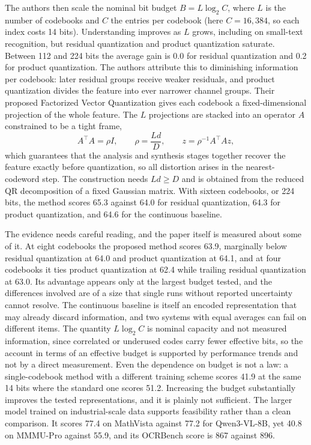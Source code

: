 \documentclass[11pt]{article}
\theoremstyle{remark}
\begin{document}
The authors then scale the nominal bit budget $B = L\log_2 C$, where $L$ is the number of codebooks and $C$ the entries per codebook (here $C = 16{,}384$, so each index costs 14 bits). Understanding improves as $L$ grows, including on small-text recognition, but residual quantization and product quantization saturate. Between 112 and 224 bits the average gain is 0.0 for residual quantization and 0.2 for product quantization. The authors attribute this to diminishing information per codebook: later residual groups receive weaker residuals, and product quantization divides the feature into ever narrower channel groups. Their proposed Factorized Vector Quantization gives each codebook a fixed-dimensional projection of the whole feature. The $L$ projections are stacked into an operator $A$ constrained to be a tight frame,
\begin{equation}
A^{\top}A = \rho I, \qquad \rho = \frac{Ld}{D}, \qquad z = \rho^{-1}A^{\top}Az,
\end{equation}
which guarantees that the analysis and synthesis stages together recover the feature exactly before quantization, so all distortion arises in the nearest-codeword step. The construction needs $Ld \ge D$ and is obtained from the reduced QR decomposition of a fixed Gaussian matrix. With sixteen codebooks, or 224 bits, the method scores 65.3 against 64.0 for residual quantization, 64.3 for product quantization, and 64.6 for the continuous baseline.

The evidence needs careful reading, and the paper itself is measured about some of it. At eight codebooks the proposed method scores 63.9, marginally below residual quantization at 64.0 and product quantization at 64.1, and at four codebooks it ties product quantization at 62.4 while trailing residual quantization at 63.0. Its advantage appears only at the largest budget tested, and the differences involved are of a size that single runs without reported uncertainty cannot resolve. The continuous baseline is itself an encoded representation that may already discard information, and two systems with equal averages can fail on different items. The quantity $L\log_2 C$ is nominal capacity and not measured information, since correlated or underused codes carry fewer effective bits, so the account in terms of an effective budget is supported by performance trends and not by a direct measurement. Even the dependence on budget is not a law: a single-codebook method with a different training scheme scores 41.9 at the same 14 bits where the standard one scores 51.2. Increasing the budget substantially improves the tested representations, and it is plainly not sufficient. The larger model trained on industrial-scale data supports feasibility rather than a clean comparison. It scores 77.4 on MathVista against 77.2 for Qwen3-VL-8B, yet 40.8 on MMMU-Pro against 55.9, and its OCRBench score is 867 against 896.
\end{document}

